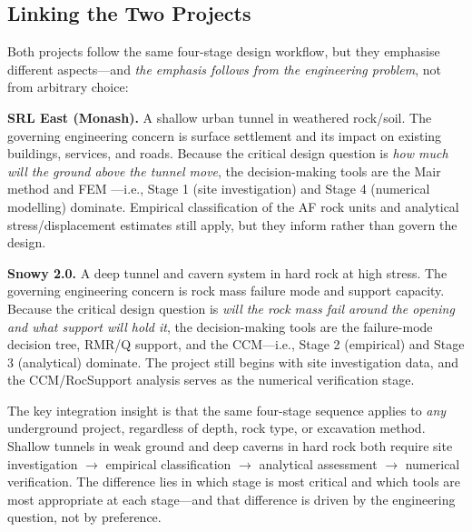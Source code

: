 \documentclass[a4paper,12pt]{article}
\begin{document}
\subsection{Linking the Two Projects}

Both projects follow the same four-stage design workflow, but they emphasise different aspects---and \textit{the emphasis follows from the engineering problem}, not from arbitrary choice:

\textbf{SRL East (Monash).} A shallow urban tunnel in weathered rock/soil. The governing engineering concern is surface settlement and its impact on existing buildings, services, and roads. Because the critical design question is \textit{how much will the ground above the tunnel move}, the decision-making tools are the Mair method and FEM ---i.e., Stage 1 (site investigation) and Stage 4 (numerical modelling) dominate. Empirical classification of the AF rock units and analytical stress/displacement estimates still apply, but they inform rather than govern the design.

\textbf{Snowy 2.0.} A deep tunnel and cavern system in hard rock at high stress. The governing engineering concern is rock mass failure mode and support capacity. Because the critical design question is \textit{will the rock mass fail around the opening and what support will hold it}, the decision-making tools are the failure-mode decision tree, RMR/Q support, and the CCM---i.e., Stage 2 (empirical) and Stage 3 (analytical) dominate. The project still begins with site investigation data, and the CCM/RocSupport analysis serves as the numerical verification stage.

\begin{notebox}
The key integration insight is that the same four-stage sequence applies to \textit{any} underground project, regardless of depth, rock type, or excavation method. Shallow tunnels in weak ground and deep caverns in hard rock both require site investigation $\to$ empirical classification $\to$ analytical assessment $\to$ numerical verification. The difference lies in which stage is most critical and which tools are most appropriate at each stage---and that difference is driven by the engineering question, not by preference.
\end{notebox}
\end{document}

